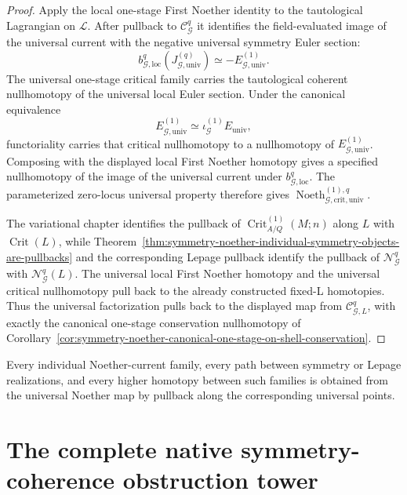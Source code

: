\begin{proof}
Apply the local one-stage First Noether identity to the tautological Lagrangian on
$\mathscr L$.  After pullback to $\mathscr C_{\mathcal G}^{q}$ it identifies the
field-evaluated image of the universal current with the negative universal symmetry
Euler section:
\[
b_{\mathcal G,\mathrm{loc}}^{q}
\left(J_{\mathcal G,\mathrm{univ}}^{(q)}\right)
\simeq
-E_{\mathcal G,\mathrm{univ}}^{(1)}.
\]
The universal one-stage critical family carries the tautological coherent
nullhomotopy of the universal local Euler section.  Under the canonical equivalence
\[
E_{\mathcal G,\mathrm{univ}}^{(1)}
\simeq
\iota_{\mathcal G}^{(1)}E_{\mathrm{univ}},
\]
functoriality carries that critical nullhomotopy to a nullhomotopy of
$E_{\mathcal G,\mathrm{univ}}^{(1)}$.  Composing with the displayed local First
Noether homotopy gives a specified nullhomotopy of the image of the universal
current under $b_{\mathcal G,\mathrm{loc}}^{q}$.  The parameterized zero-locus
universal property therefore gives
$\operatorname{Noeth}_{\mathcal G,\mathrm{crit},\mathrm{univ}}^{(1),q}$.

The variational chapter identifies the pullback of
$\operatorname{Crit}_{A/Q}^{(1)}(M;n)$ along $L$ with $\operatorname{Crit}(L)$,
while Theorem~\ref{thm:symmetry-noether-individual-symmetry-objects-are-pullbacks}
and the corresponding Lepage pullback identify the pullback of
$\mathscr N_{\mathcal G}^{q}$ with $\mathcal N_{\mathcal G}^{q}(L)$.  The universal
local First Noether homotopy and the universal critical nullhomotopy pull back to
the already constructed fixed-L homotopies.  Thus the universal factorization pulls
back to the displayed map from $\mathcal C_{\mathcal G,L}^{q}$, with exactly the
canonical one-stage conservation nullhomotopy of
Corollary~\ref{cor:symmetry-noether-canonical-one-stage-on-shell-conservation}.
\end{proof}

\begin{proposition}
\label{prop:symmetry-noether-individual-current-families-are-pullbacks}
Every individual Noether-current family, every path between symmetry or Lepage
realizations, and every higher homotopy between such families is obtained from the
universal Noether map by pullback along the corresponding universal points.
\end{proposition}

\section{The complete native symmetry-coherence obstruction tower}
\label{sec:symmetry-noether-the-complete-native-symmetry-coherence-obstruction-tower}


